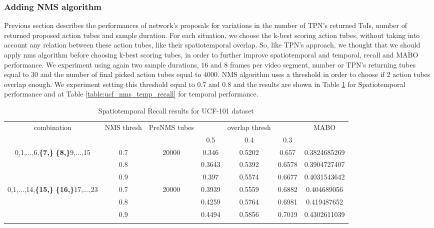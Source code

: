 \subsubsection{Adding NMS algorithm}

Previous section describes the performances of network's proposals for variations in the number of  TPN's  returned ToIs, number of returned
proposed action tubes and sample duration. For each situation, we choose the k-best scoring action tubes, without taking into account
any relation between these action tubes, like their spatiotemporal overlap. So, like TPN's approach, we thought that we should apply
nms algorithm before choosing k-best scoring tubes, in order to further improve  spatiotemporal and temporal, recall and MABO  performance.
We experiment using again two sample durations, 16 and 8 frames per video segment, number or TPN's returning tubes equal to 30 and the
number of final picked action tubes equal to 4000. NMS algorithm uses a threshold in order to choose if 2 action tubes overlap enough. We
experiment setting this threshold equal to 0.7 and 0.8 and  the results are shown in Table \ref{table:ucf_nms_recall} for Spatiotemporal
performance and at Table \ref{table:ucf_nms_temp_recall} for temporal performance.

\begin{center}
  \setlength{\tabcolsep}{2pt}
\begin{longtable}{||c | c | c | c c c| c|}

  \hline
  \multirow{2}{*}{combination} & \multirow{2}{2.5em}{NMS thresh} & \multirow{2}{3.5em}{PreNMS tubes} &  {} &overlap thresh & {} & \multirow{2}{*}{MABO} \\
  {} & {} & {} &  0.5 &  0.4 & 0.3 & {}\\         
  \hline
  \multirow{3}{7em}{0,1,...,6,\textbf{\{7,\}}
  \textbf{\{8,\}}9,...,15 }  & 0.7 &\multirow{3}{*}{20000}  & 0.346 & 0.5202 & 0.657 & 0.3824685269 \\
  \cline{2-2} \cline{4-7} 
  {} &  0.8   & {}   & 0.3643 & 0.5392 & 0.6578 & 0.3904727407 \\
  \cline{2-2} \cline{4-7} 
  {} &  0.9   & {}   & 0.397  & 0.5574 & 0.6677 & 0.4031543642 \\
  \hline                                    
  \multirow{3}{7em}{0,1,...,14,\textbf{\{15,\}}
  \textbf{\{16,\}}17,...,23 }  & 0.7 & \multirow{3}{*}{20000}   & 0.3939 & 0.5559  & 0.6882 & 0.404689056 \\
  \cline{2-2} \cline{4-7} 
                                    {} &  0.8   & {}   & 0.4259 & 0.5764 & 0.6981 & 0.419487652 \\
  \cline{2-2} \cline{4-7} 
                                    {} &  0.9   & {}   & 0.4494 & 0.5856 & 0.7019 & 0.4302611039 \\

  \hline                                    

  \caption{Spatiotemporal Recall results for UCF-101 dataset}
  \label{table:ucf_nms_recall}
\end{longtable} 
\end{center}

